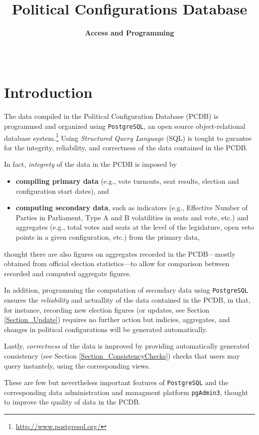 \documentclass[%
parskip=half-,%
fontsize=12pt,%
DIV=13,%
oneside,%
english,%
abstract=off,%
toc=chapterentrywithdots,toc=bibnumbered]{scrreprt}
\title{\huge Political Configurations Database}
\subtitle{\SubTitleFont\textbf{Access and Programming}}
\author{
	\and%
	\and%
}
\date{\monthname\ \the\year}
\newcommand\txtfont{\fontsize{11.5}{13.7}\selectfont}
\begin{document}
\maketitle
\newpage

\tableofcontents
\thispagestyle{empty}
\newpage

\chapter{Introduction}

The data compiled in the Political Configuration Database (PCDB) is programmed and organized using \texttt{\txtfont PostgreSQL}, an open source object-relational database system.\footnote{\url{http://www.postgresql.org/}} 
Using \emph{Structured Query Language} (SQL) is tought to gurantee for the integrity, reliability, and correctness of the data contained in the PCDB.

In fact, \emph{integrety} of the data in the PCDB is imposed by 
\begin{itemize}
\item[]\textbf{compiling primary data} (e.g., vote turnouts, seat results, election and configuration start dates), and \item[]\textbf{computing secondary data}, such as indicators (e.g., Effective Number of Parties in Parliament, Type A and B volatilities in seats and vote, etc.) and aggregates (e.g., total votes and seats at the level of the legislature, open veto points in a given configuration, etc.) from the primary data,
\end{itemize}
thought there are also figures on aggregates recorded in the PCDB---mostly obtained from official election statistics---to allow for comparison between recorded and computed aggregate figures.

In addition, programming the computation of secondary data using \texttt{\txtfont PostgreSQL} ensures the \emph{reliability} and actuallity of the data contained in the PCDB, in that, for instance, recording new election figures (or updates, see Section \ref{Section_Update}) requires no further action but indicies, aggregates, and changes in political configurations will be generated automatically.

Lastly, \emph{correctness} of the data is improved by providing automatically generated consistency (see Section \ref{Section_ConsistencyChecks}) checks that users may query instantely, using the corresponding views. 

These are few but nevertheless important features of \texttt{\txtfont PostgreSQL} and the corresponding data administration and managment platform \texttt{\txtfont pgAdmin3}, thought to improve the quality of data in the PCDB.
\end{document}
